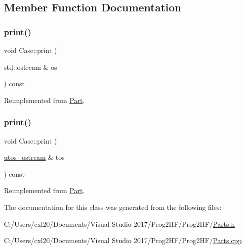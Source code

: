 \subsection{Member Function Documentation}
\mbox{\label{class_case_a9e54f42dcb7b62f1792a6475ce60aa79}} 
\subsubsection{\texorpdfstring{print()}{print()}\hspace{0.1cm}{\footnotesize\ttfamily [1/2]}}
{\footnotesize\ttfamily void Case\+::print (\begin{DoxyParamCaption}\item[{std\+::ostream \&}]{os }\end{DoxyParamCaption}) const\hspace{0.3cm}{\ttfamily [virtual]}}



Reimplemented from \mbox{\hyperlink{class_part_a4fa402b8e8fd4236ff773a7697ab2bc3}{Part}}.

\mbox{\label{class_case_ae179519844b825815f4accddafae13b6}} 
\subsubsection{\texorpdfstring{print()}{print()}\hspace{0.1cm}{\footnotesize\ttfamily [2/2]}}
{\footnotesize\ttfamily void Case\+::print (\begin{DoxyParamCaption}\item[{\mbox{\hyperlink{structutos__ostream}{utos\+\_\+ostream}} \&}]{tos }\end{DoxyParamCaption}) const\hspace{0.3cm}{\ttfamily [virtual]}}



Reimplemented from \mbox{\hyperlink{class_part_a9ecabe44ba3415badf82c6a23617a41e}{Part}}.



The documentation for this class was generated from the following files\+:\begin{DoxyCompactItemize}
\item 
C\+:/\+Users/cxl20/\+Documents/\+Visual Studio 2017/\+Prog2\+H\+F/\+Prog2\+H\+F/\mbox{\hyperlink{_parts_8h}{Parts.\+h}}\item 
C\+:/\+Users/cxl20/\+Documents/\+Visual Studio 2017/\+Prog2\+H\+F/\+Prog2\+H\+F/\mbox{\hyperlink{_parts_8cpp}{Parts.\+cpp}}\end{DoxyCompactItemize}
